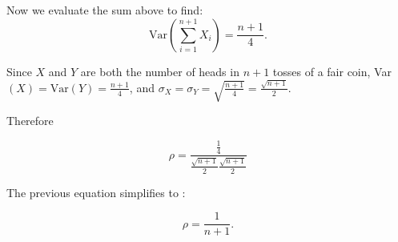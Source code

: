 \documentclass[a4paper,11pt]{article}
\begin{document}
Now we evaluate the sum above to find:
\begin{equation}
\text{Var}\left( \sum_{i=1}^{n+1} X_i \right) = 
     \frac{n+1}{4}.
\end{equation}

Since $X$ and $Y$ are both the number of heads in $n+1$ tosses of a fair coin,
Var$\left(X \right) = \text{Var}\left(Y \right) = \frac{n+1}{4}$, and
$\sigma_X = \sigma_Y = \sqrt{\frac{n+1}{4}} = \frac{\sqrt{n+1}}{2}$.

Therefore

\begin{equation}
\rho = \frac{ \frac{1}{4} }{ \frac{\sqrt{n+1}}{2}\frac{\sqrt{n+1}}{2}}
\end{equation}

The previous equation simplifies to :

\begin{equation}
\rho = \frac{1}{n+1}.
\end{equation}


\printbibliography{}
\end{document}
